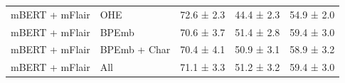 \documentclass[12pt,a4paper,]{book}
\begin{document}
\begin{longtable}[t]{lllll}
\hspace{1em}mBERT + mFlair & OHE & 72.6 ±  2.3 & 44.4 ±  2.3 & 54.9 ±  2.0\\
\hspace{1em}mBERT + mFlair & BPEmb & 70.6 ±  3.7 & 51.4 ±  2.8 & 59.4 ±  3.0\\
\hspace{1em}mBERT + mFlair & BPEmb + Char & 70.4 ±  4.1 & 50.9 ±  3.1 & 58.9 ±  3.2\\
\hspace{1em}mBERT + mFlair & All & 71.1 ±  3.3 & 51.2 ±  3.2 & 59.4 ±  3.0\\*
\end{longtable}
\endgroup{}


\end{document}

